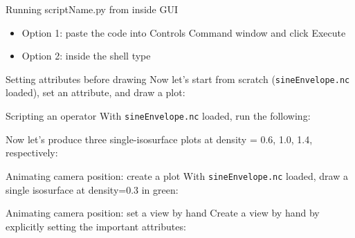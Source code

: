 \begin{frame}{Running scriptName.py from inside GUI}
  \begin{itemize}\setlength{\itemsep}{3mm}
  \item Option 1: paste the code into Controls \ra Command window and click Execute
  \item Option 2: inside the shell type \runScript
  \end{itemize}
\end{frame}

\begin{frame}{Setting attributes before drawing}
  Now let's start from scratch (\texttt{sineEnvelope.nc} loaded), set an attribute, and draw a plot:
  
\end{frame}

\begin{frame}{Scripting an operator}
  With \texttt{sineEnvelope.nc} loaded, run the following:
  
  \pause
  Now let's produce three single-isosurface plots at density = 0.6, 1.0, 1.4, respectively:
  
\end{frame}


\begin{frame}{Animating camera position: create a plot}
  With \texttt{sineEnvelope.nc} loaded, draw a single isosurface at density=0.3 in green:
  
    \pause
  
\end{frame}

\begin{frame}{Animating camera position: set a view by hand}
  Create a view by hand by explicitly setting the important attributes:
  
\end{frame}

